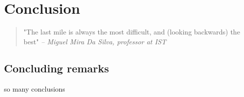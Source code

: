 \chapter{Conclusion}
\label{ch:conclusion}

\begin{quotation}
  "The last mile is always the most difficult, and (looking backwards) the best"
  {\small\it -- Miguel Mira Da Silva, professor at IST}
\end{quotation}

\section{Concluding remarks}

so many conclusions
